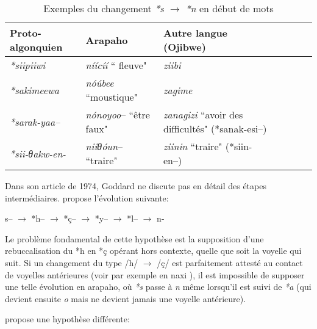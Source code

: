 \documentclass[twoside,a4paper,11pt]{article}
\newcommand{\ipa}[1]{{\phon\textit{#1}}}
\newcommand{\Σ}{\greek{Σ}}
\begin{document}
 \begin{table}[H]
\caption{Exemples du changement \ipa{*s} $\rightarrow$ \ipa{*n} en début de mots} \centering  \label{tab:s.n}
\begin{tabular}{lllllll}
\toprule
Proto-algonquien & Arapaho & Autre langue (Ojibwe)\\
\midrule
 \ipa{*siipiiwi} &  \ipa{níícíí}    `` fleuve"    &  \ipa{ziibi} \\
\ipa{*sakimeewa}  & \ipa{nóúbee} ``moustique" &  \ipa{zagime} \\
\ipa{*sarak-yaa--}  & \textit{nónoyoo}-- ``être faux" & \textit{zanagizi} ``avoir des difficultés" (*sanak-esi--) \\
\ipa{*sii-θakw-en-}  & \textit{niiθóun}--  ``traire"& \textit{ziinin} ``traire" (*siin-en--) \\
\bottomrule
\end{tabular}
\end{table}

Dans son article de 1974, Goddard ne discute pas en détail des étapes intermédiaires.  \citet{picard94sn} propose l'évolution suivante:

 \begin{exe}
\ex
\glt *s-- $\rightarrow$ *h-- $\rightarrow$ *ç-- $\rightarrow$ *y-- $\rightarrow$ *l-- $\rightarrow$ n-
\end{exe}

Le problème fondamental de cette hypothèse est la supposition d'une rebuccalisation du *h en *ç opérant hors contexte, quelle que soit la voyelle qui suit. Si un changement du type /h/  $\rightarrow$ /ç/ est parfaitement attesté au contact de voyelles antérieures (voir par exemple en naxi \citealt[27-33]{michaud06neutralisation}), il est impossible de supposer une telle évolution en arapaho, où \ipa{*s} passe à \ipa{n} même lorsqu'il est suivi de \ipa{*a} (qui devient ensuite \ipa{o} mais ne devient jamais une voyelle antérieure).

 \citet[76]{goddard01plains} propose une hypothèse différente:
\end{document}
